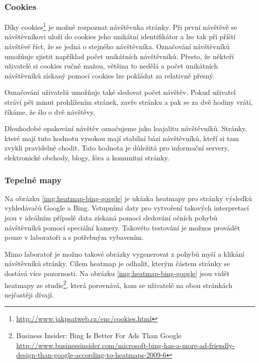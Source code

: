 \documentclass[bc,male,java,dept456]{diploma}						%
\begin{document}
\subsubsection{Cookies}

Díky cookies\footnote{\url{http://www.jakpsatweb.cz/enc/cookies.html}} je možné rozpoznat návštěvnka stránky. Při první návštěvě se ná\-vště\-vní\-ko\-vi uloží do cookies jeho unikátní identifikátor a lze tak při příští návštěvě říct, že se jedná o stejného návštěvníka. Označování návštěvníků umožňuje zjistit například počet uni\-kát\-ních návštěvníků. Přesto, že někteří uživatelé si cookies ručně mažou, většina to nedělá a počet unikátních návštěvníků získaný pomocí cookies lze pokládat za relativně přesný.

Označování uživatelů umožňuje také sledovat počet návštěv. Pokud uživatel stráví pět minut prohlížením stránek, zavře stránku a pak se za dvě hodiny vrátí, říkáme, že šlo o dvě návštěvy.

Dlouhodobé opakování návštěv označujeme jako loajalitu návštěvníků. Stránky, které mají tuto hodnotu vysokou mají stabilní bázi návštěvníků, kteří si tam zvykli pravidelně chodit. Tato hodnota je důležitá pro informační servery, elektronické obchody, blogy, fóra a komunitní stránky.





\subsubsection{Tepelné mapy}

Na obrázku \ref{img:heatmap-bing-google} je ukázka heatmapy pro stránky výsledků vyhledávačů Google a Bing. Vstupními daty pro vytvoření takových interpretací jsou v ideálním případě data získaná pomocí sledování očních pohybů návštěvníků pomocí speciální kamery. Takovéto tes\-to\-vá\-ní je možnos provádět pouze v laboratoři a s potřebným vybavením.

Mimo laboratoř je možno takové obrázky vygenerovat z pohybů myší a klikání ná\-vště\-vní\-ků stránky. Cílem heatmap je odhalit, kterým částem stránky se dostává více pozornosti. Na obrázku \ref{img:heatmap-bing-google} jsou vidět heatmapy ze studie\footnote{Business Insider: Bing Is Better For Ads Than Google \url{http://www.businessinsider.com/microsoft-bing-has-a-more-ad-friendly-design-than-google-according-to-heatmaps-2009-6}}, která porovnává, kam se uživatelé na obou stránkách nejčastěji dívají.
\end{document}
